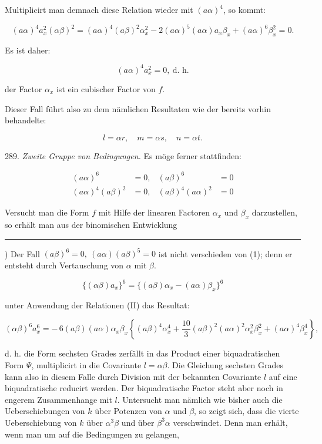 \documentclass[11pt]{article}
\providecommand{\weberpage}[1]{}
\providecommand{\weq}[2]{\begin{equation}\tag{#1}#2\end{equation}}
\let\Psi\varPsi
\begin{document}
Multiplicirt man demnach diese Relation wieder mit $(a\alpha)^4$, so kommt:

\[ (a\alpha)^4 a_x^2 (\alpha\beta)^2 = (a\alpha)^4(a\beta)^2\alpha_x^2 - 2(a\alpha)^5(a\alpha) a_x\beta_x + (a\alpha)^6\beta_x^2 = 0. \]

Es ist daher:

\[ (a\alpha)^4 a_x^2 = 0,\ \text{d. h.} \]

\glqq der Factor $\alpha_x$ ist ein cubischer Factor von $f$\grqq{}.

Dieser Fall führt also zu dem nämlichen Resultaten wie der bereits vorhin behandelte: %

\[ l = \alpha r,\quad m = \alpha s,\quad n = \alpha t. \]

289. \textit{Zweite Gruppe von Bedingungen.} Es möge ferner stattfinden:

\weq{II}{\begin{aligned} (a\alpha)^6&=0, & (a\beta)^6&=0\\ (a\alpha)^4(a\beta)^2&=0, & (a\beta)^4(a\alpha)^2&=0 \end{aligned}}

Versucht man die Form $f$ mit Hilfe der linearen Factoren $\alpha_x$ und $\beta_x$ darzustellen, so erhält man aus der binomischen Entwicklung

\noindent\rule{4cm}{0.4pt}

\noindent *) Der Fall $(a\beta)^6=0,\ (a\alpha)(a\beta)^5=0$ ist nicht verschieden von (1); denn er entsteht durch Vertauschung von $\alpha$ mit $\beta$.


\weberpage{314}

\[ \{(\alpha\beta) a_x\}^6 = \{(a\beta)\alpha_x - (a\alpha)\beta_x\}^6 \]

unter Anwendung der Relationen (II) das Resultat:

\[ (\alpha\beta)^6 a_x^6 = -\,6(a\beta)(a\alpha)\alpha_x\beta_x \left\{ (a\beta)^4\alpha_x^4 + \frac{10}{3}(a\beta)^2(a\alpha)^2\alpha_x^2\beta_x^2 + (a\alpha)^4\beta_x^4 \right\}, \]

d. h. die Form sechsten Grades zerfällt in das Product einer biquadratischen Form $\Psi$, multiplicirt in die Covariante $l=\alpha\beta$. Die Gleichung sechsten Grades kann also in diesem Falle durch Division mit der bekannten Covariante $l$ auf eine biquadratische reducirt werden. Der biquadratische Factor steht aber noch in engerem Zusammenhange mit $l$. Untersucht man nämlich wie bisher auch die Ueberschiebungen von $k$ über Potenzen von $\alpha$ und $\beta$, so zeigt sich, dass die vierte Ueberschiebung von $k$ über $\alpha^3\beta$ und über $\beta^3\alpha$ verschwindet. Denn man erhält, wenn man um auf die Bedingungen zu gelangen,
\end{document}
